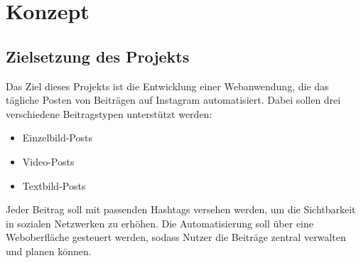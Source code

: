 \chapter{Konzept}
\label{sec:chapter1}

\section{Zielsetzung des Projekts}
\label{sec:chapter1-1}

Das Ziel dieses Projekts ist die Entwicklung einer Webanwendung, die das tägliche Posten von Beiträgen auf Instagram automatisiert. Dabei sollen drei verschiedene 
Beitragstypen unterstützt werden:

\begin{itemize}
    \item Einzelbild-Posts
    \item Video-Posts
    \item Textbild-Posts
\end{itemize}

Jeder Beitrag soll mit passenden Hashtags versehen werden, um die Sichtbarkeit in sozialen Netzwerken zu erhöhen. Die Automatisierung soll über eine Weboberfläche 
gesteuert werden, sodass Nutzer die Beiträge zentral verwalten und planen können.

